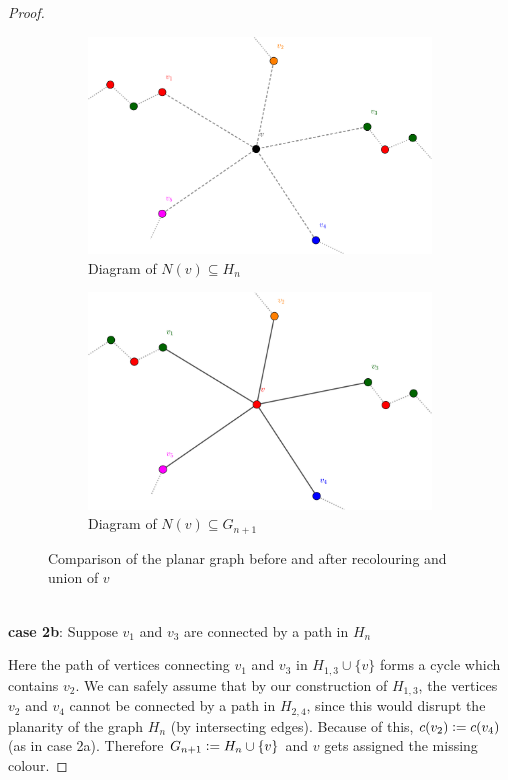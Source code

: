 \begin{proof}
\begin{figure}[H]
\centering
\begin{subfigure}[H]{0.49\textwidth}
\includegraphics[width=\textwidth]{img/case2a_first.pdf}
\caption{Diagram of $N(v) \subseteq H_{n}$}
\label{fig:case2a_first}
\end{subfigure}
\begin{subfigure}[H]{0.49\textwidth}
\includegraphics[width=\textwidth]{img/case2a_second.pdf}
\caption{Diagram of $N(v) \subseteq G_{n + 1}$}
\label{fig:case2a_second}
\end{subfigure}
\caption{Comparison of the planar graph before and after recolouring and union of $v$}
\end{figure}

$\phantom{x}$ \\
\textbf{case 2b}: Suppose $v_1$ and $v_3$ are connected by a path in $H_{n}$

Here the path of vertices connecting $v_{1}$ and $v_{3}$ in $H_{1,3} \cup \{v\}$ forms a cycle which contains $v_{2}$. We can safely assume that by our construction of $H_{1,3}$, the vertices $v_{2}$ and $v_{4}$ cannot be connected by a path in $H_{2,4}$, since this would disrupt the planarity of the graph $H_{n}$ (by intersecting edges). Because of this, $c(v_{2}) \vcentcolon= c(v_{4})$ (as in case 2a). Therefore $G_{n + 1} \vcentcolon= H_{n} \cup \{v\}$ and $v$ gets assigned the missing colour.


\end{proof}
